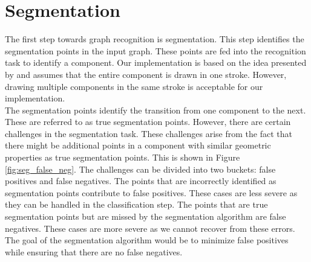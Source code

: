 \section{Segmentation}
The first step towards graph recognition is segmentation. This step identifies the segmentation points in the input graph. These points are fed into the recognition task to identify a component. Our implementation is based on the idea presented by \citeauthor{daly2015hand} \cite{daly2015hand} and assumes that the entire component is drawn in one stroke. However, drawing multiple components in the same stroke is acceptable for our implementation.\\

The segmentation points identify the transition from one component to the next. These are referred to as true segmentation points.  However, there are certain challenges in the segmentation task. These challenges arise from the fact that there might be additional points in a component with similar geometric properties as true segmentation points. This is shown in Figure \ref{fig:seg_false_neg}. The challenges can be divided into two buckets: false positives and false negatives. The points that are incorrectly identified as segmentation points contribute to false positives. These cases are less severe as they can be handled in the classification step. The points that are true segmentation points but are missed by the segmentation algorithm are false negatives. These cases are more severe as we cannot recover from these errors. The goal of the segmentation algorithm would be to minimize false positives while ensuring that there are no false negatives.\\

